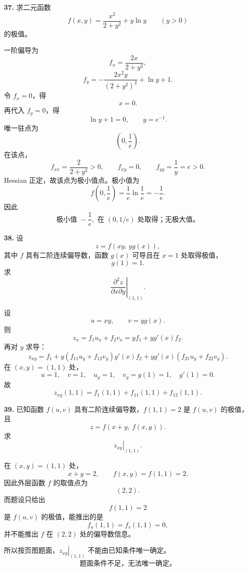 \begin{problemblock}
\textbf{37.} 求二元函数
\[
f(x,y)=\frac{x^2}{2+y^2}+y\ln y\qquad(y>0)
\]
的极值。
\end{problemblock}

\begin{solutionblock}
一阶偏导为
\[
f_x=\frac{2x}{2+y^2},
\]
\[
f_y=-\frac{2x^2y}{(2+y^2)^2}+\ln y+1.
\]
令 \(f_x=0\)，得
\[
x=0.
\]
再代入 \(f_y=0\)，得
\[
\ln y+1=0,\qquad y=e^{-1}.
\]
唯一驻点为
\[
\left(0,\frac1e\right).
\]
在该点，
\[
f_{xx}=\frac{2}{2+y^2}>0,\qquad f_{xy}=0,\qquad f_{yy}=\frac1y=e>0.
\]
Hessian 正定，故该点为极小值点。极小值为
\[
f\left(0,\frac1e\right)=\frac1e\ln\frac1e=-\frac1e.
\]
因此
\[
\boxed{\text{极小值 }-\frac1e,\text{ 在 }(0,1/e)\text{ 处取得；无极大值。}}
\]
\end{solutionblock}

\begin{problemblock}
\textbf{38.} 设
\[
z=f(xy,\,y g(x)),
\]
其中 \(f\) 具有二阶连续偏导数，函数 \(g(x)\) 可导且在 \(x=1\) 处取得极值，
\[
g(1)=1.
\]
求
\[
\left.\frac{\partial^2z}{\partial x\partial y}\right|_{(1,1)}.
\]
\end{problemblock}

\begin{solutionblock}
设
\[
u=xy,\qquad v=yg(x).
\]
则
\[
z_x=f_1u_x+f_2v_x
=y f_1+yg'(x)f_2.
\]
再对 \(y\) 求导：
\[
z_{xy}=f_1+y(f_{11}u_y+f_{12}v_y)
g'(x)f_2+yg'(x)(f_{21}u_y+f_{22}v_y).
\]
在 \((x,y)=(1,1)\) 处，
\[
u=1,\quad v=1,\quad u_y=1,\quad v_y=g(1)=1,\quad g'(1)=0.
\]
故
\[
\boxed{z_{xy}(1,1)=f_1(1,1)+f_{11}(1,1)+f_{12}(1,1)}.
\]
\end{solutionblock}

\begin{problemblock}
\textbf{39.} 已知函数 \(f(u,v)\) 具有二阶连续偏导数，\(f(1,1)=2\) 是 \(f(u,v)\) 的极值，且
\[
z=f(x+y,\ f(x,y)).
\]
求
\[
\left.z_{xy}\right|_{(1,1)}.
\]
\end{problemblock}

\begin{solutionblock}
在 \((x,y)=(1,1)\) 处，
\[
x+y=2,\qquad f(x,y)=f(1,1)=2.
\]
因此外层函数 \(f\) 的取值点为
\[
(2,2).
\]
而题设只给出
\[
f(1,1)=2
\]
是 \(f(u,v)\) 的极值，能推出的是
\[
f_u(1,1)=f_v(1,1)=0,
\]
并不能推出 \(f\) 在 \((2,2)\) 处的偏导数信息。

所以按页图题面，\(\left.z_{xy}\right|_{(1,1)}\) 不能由已知条件唯一确定。
\[
\boxed{\text{题面条件不足，无法唯一确定。}}
\]
\end{solutionblock}

